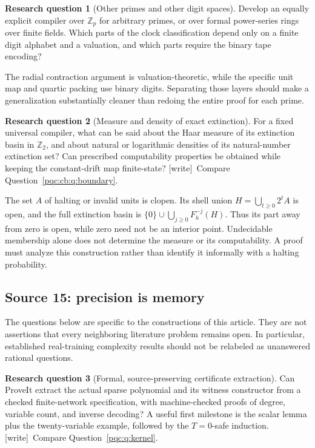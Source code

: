\documentclass[11pt,letterpaper]{article}
\numberwithin{equation}{section}
\theoremstyle{definition}
\newtheorem{question}{Research question}
\theoremstyle{remark}
\newcommand{\wtag}{\textup{[write]}}
\newcommand{\Ztwo}{\mathbb Z_2}
\newcommand{\Zp}{\mathbb Z_p}
\begin{document}
\begin{question}[Other primes and other digit spaces]
Develop an equally explicit compiler over $\Zp$ for arbitrary primes,
or over formal power-series rings over finite fields. Which parts of the
clock classification depend only on a finite digit alphabet and a
valuation, and which parts require the binary tape encoding?
\end{question}
The radial contraction argument is valuation-theoretic, while the specific
unit map and quartic packing use binary digits. Separating those layers
should make a generalization substantially cleaner than redoing the
entire proof for each prime.

\begin{question}[Measure and density of exact extinction]\label{pqc:ad:q:measure}
For a fixed universal compiler, what can be said about the Haar measure of
its extinction basin in $\Ztwo$, and about natural or logarithmic densities
of its natural-number extinction set? Can prescribed computability
properties be obtained while keeping the constant-drift map finite-state?
\wtag\ Compare Question~\ref{pqc:cb:q:boundary}.
\end{question}
The set $A$ of halting or invalid units is clopen. Its shell union
$H=\bigcup_{t\ge0}2^t A$ is open, and the full extinction basin is
$\{0\}\cup\bigcup_{j\ge0}F_h^{-j}(H)$. Thus its part away from zero is
open, while zero need not be an interior point. Undecidable membership
alone does not determine the measure or its computability. A proof must analyze this construction rather than
identify it informally with a halting probability.

\subsection{Source 15: precision is memory}
\label{pqc:pm:sec:questions}

The questions below are specific to the constructions of this article.
They are not assertions that every neighboring literature problem remains
open. In particular, established real-training complexity results should
not be relabeled as unanswered rational questions.

\begin{question}[Formal, source-preserving certificate extraction]
Can ProveIt extract the actual sparse polynomial and its witness constructor
from a checked finite-network specification, with machine-checked proofs of
degree, variable count, and inverse decoding? A useful first milestone is
the scalar lemma plus the twenty-variable example, followed by the
$T=0$-safe induction.
\wtag\ Compare Question~\ref{pqc:q:kernel}.
\end{question}
\end{document}
